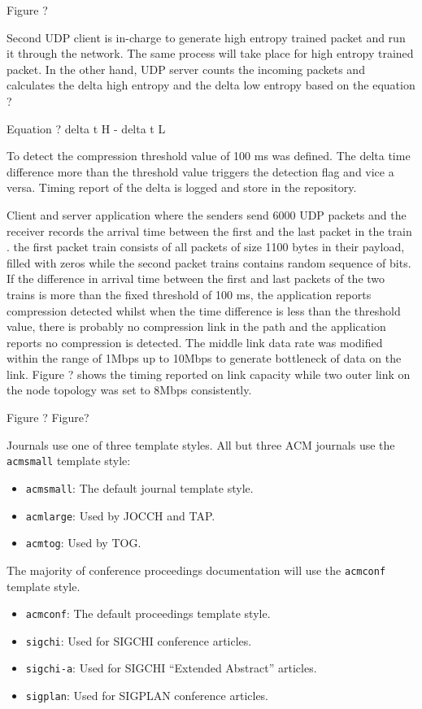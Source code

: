 \documentclass[sigconf]{acmart}
\begin{document}
 Figure ?
 
Second UDP client is in-charge to generate high entropy trained packet and run it through the network. The same process will take place for high entropy trained packet. In the other hand, UDP server counts the incoming packets and calculates the delta high entropy and the delta low entropy based on the equation ?

Equation ? delta t H - delta t L 

To detect the compression threshold value of 100 ms was defined.  The delta time difference more than the threshold value triggers the detection flag and vice a versa. Timing report of the delta is logged and store in the repository.  
 
Client and server application where the senders send 6000 UDP packets and the receiver records the arrival time between the first and the last packet in the train . the first packet train consists of all packets of size 1100 bytes in their payload, filled with zeros while the second packet trains contains random sequence of bits. If the difference in arrival time between the first and last packets of the two trains is more than the fixed threshold of 100 ms, the application reports compression detected whilst when the time difference is less than the threshold value, there is probably no compression link in the path and the application reports no compression is detected. The middle link data rate was modified within the range of 1Mbps up to 10Mbps to generate bottleneck of data on the link. Figure ? shows the timing reported on link capacity while two outer link on the node topology was set to 8Mbps consistently. 

Figure ?
Figure?




Journals use one of three template styles. All but three ACM journals
use the {\verb|acmsmall|} template style:
\begin{itemize}
\item {\verb|acmsmall|}: The default journal template style.
\item {\verb|acmlarge|}: Used by JOCCH and TAP.
\item {\verb|acmtog|}: Used by TOG.
\end{itemize}


The majority of conference proceedings documentation will use the {\verb|acmconf|} template style.
\begin{itemize}
\item {\verb|acmconf|}: The default proceedings template style.
\item{\verb|sigchi|}: Used for SIGCHI conference articles.
\item{\verb|sigchi-a|}: Used for SIGCHI ``Extended Abstract'' articles.
\item{\verb|sigplan|}: Used for SIGPLAN conference articles.
\end{itemize}
\end{document}
